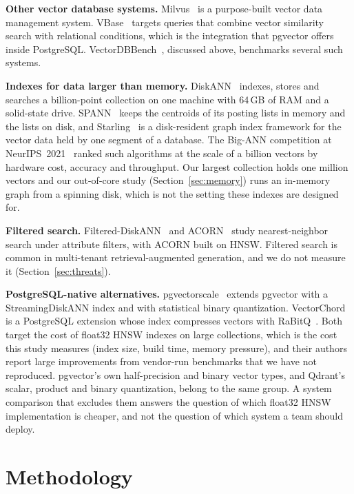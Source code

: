 \documentclass[sigconf, nonacm]{acmart}
\begin{document}
\textbf{Other vector database systems.} Milvus~\cite{milvus2021} is a purpose-built vector
data management system. VBase~\cite{vbase2023} targets queries that combine vector similarity
search with relational conditions, which is the integration that pgvector offers inside
PostgreSQL. VectorDBBench~\cite{vectordbbench}, discussed above, benchmarks several such
systems.

\textbf{Indexes for data larger than memory.} DiskANN~\cite{diskann2019} indexes, stores and
searches a billion-point collection on one machine with 64\,GB of RAM and a solid-state
drive. SPANN~\cite{spann2021} keeps the centroids of its posting lists in memory and the lists
on disk, and Starling~\cite{starling2024} is a disk-resident graph index framework for the
vector data held by one segment of a database. The Big-ANN competition at
NeurIPS~2021~\cite{bigann2022} ranked such algorithms at the scale of a billion vectors by
hardware cost, accuracy and throughput. Our largest collection holds one million vectors
and our out-of-core study (Section~\ref{sec:memory}) runs an in-memory graph from a
spinning disk, which is not the setting these indexes are designed for.

\textbf{Filtered search.} Filtered-DiskANN~\cite{filtereddiskann2023} and
ACORN~\cite{acorn2024} study nearest-neighbor search under attribute filters, with ACORN built
on HNSW. Filtered search is common in multi-tenant retrieval-augmented generation, and we do
not measure it (Section~\ref{sec:threats}).

\textbf{PostgreSQL-native alternatives.} pgvectorscale~\cite{pgvectorscale} extends pgvector
with a StreamingDiskANN index and with statistical binary quantization.
VectorChord~\cite{vectorchord} is a PostgreSQL extension whose index compresses vectors with
RaBitQ~\cite{rabitq2024}. Both target the cost of float32 HNSW indexes on large collections,
which is the cost this study measures (index size, build time, memory pressure), and their
authors report large improvements from vendor-run benchmarks that we have not reproduced.
pgvector's own half-precision and binary vector types, and Qdrant's scalar, product and
binary quantization, belong to the same group. A system comparison that excludes them
answers the question of which float32 HNSW implementation is cheaper, and not the question
of which system a team should deploy.

\section{Methodology}
\end{document}
